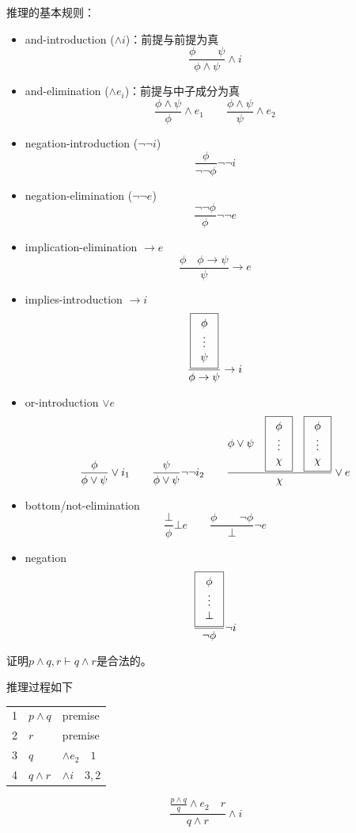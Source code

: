 推理的基本规则：
\begin{itemize}
	\item and-introduction ($\land i$)：前提与前提为真
	\[\frac{\phi\qquad\psi}{\phi\land\psi}\land i\]
	\item and-elimination ($\land e_i$)：前提与中子成分为真
	\[\frac{\phi\land\psi}{\phi}\land e_1\qquad \frac{\phi\land\psi}{\psi}\land e_2\]
	\item negation-introduction ($\lnot\lnot i$)
	\[\frac{\phi}{\lnot\lnot\phi}\lnot\lnot i\]
	\item negation-elimination ($\lnot\lnot e$)
	\[\frac{\lnot\lnot\phi}{\phi}\lnot\lnot e\]
	\item implication-elimination $\to e$
	\[\frac{\phi\quad \phi\to\psi}{\psi}\to e\]
	\item implies-introduction $\to i$
	\[\dfrac{\fbox{\begin{tabular}{c}$\phi$\\$\vdots$\\$\psi$\end{tabular}}}{\phi\to\psi}\to i\]
	\item or-introduction $\lor e$
	\[\frac{\phi}{\phi\lor\psi}\lor i_1\qquad
	\frac{\psi}{\phi\lor\psi}\lnot\lnot i_2\qquad
	\frac{\phi\lor\psi\quad \fbox{\begin{tabular}{c}$\phi$\\$\vdots$\\$\chi$\end{tabular}}\quad \fbox{\begin{tabular}{c}$\phi$\\$\vdots$\\$\chi$\end{tabular}}}{\chi}\lor e\]
	\item bottom/not-elimination
	\[\frac{\bot}{\phi}\bot e\qquad \frac{\phi\qquad\lnot\phi}{\bot}\lnot e\]
	\item negation
	\[\frac{\fbox{\begin{tabular}{c}$\phi$\\$\vdots$\\$\bot$\end{tabular}}}{\lnot \phi}\lnot i\]
\end{itemize}

\begin{example}
证明$p\land q,r\vdash q\land r$是合法的。
\end{example}
\begin{analysis}
推理过程如下
\begin{center}
\begin{tabular}{lll}
1 & $p\land q$ & premise\\
2 & $r$ & premise\\
3 & $q$ & $\land e_2\quad 1$\\
4 & $q\land r$ & $\land i\quad 3,2$
\end{tabular}
\end{center}
\[\frac{\frac{p\land q}{q}\land e_2\quad r}{q\land r}\land i\]
\end{analysis}

